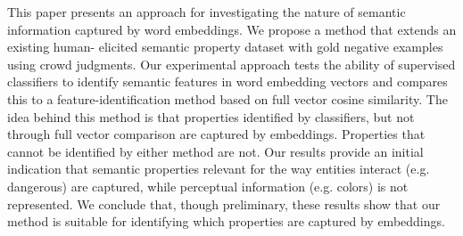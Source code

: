 This paper presents an approach for investigating the nature of semantic information captured by word embeddings. We propose a method that extends an existing human- elicited semantic property dataset with gold negative examples using crowd judgments. Our experimental approach tests the ability of supervised classifiers to identify semantic features in word embedding vectors and compares this to a feature-identification method based on full vector cosine similarity. The idea behind this method is that properties identified by classifiers, but not through full vector comparison are captured by embeddings. Properties that cannot be identified by either method are not. Our results provide an initial indication that semantic properties relevant for the way entities interact (e.g. dangerous) are captured, while perceptual information (e.g. colors) is not represented. We conclude that, though preliminary, these results show that our method is suitable for identifying which properties are captured by embeddings.

